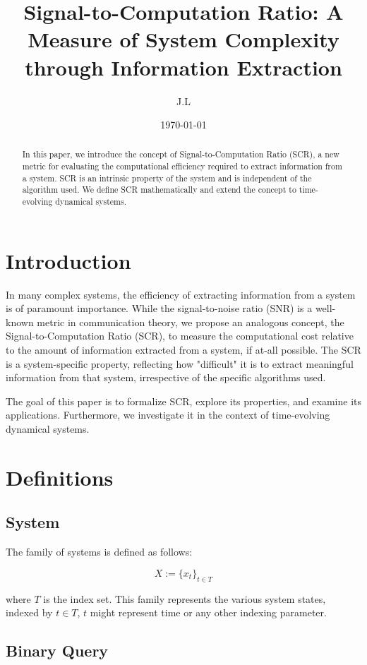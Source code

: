 \documentclass[11pt,a4paper]{article}
\title{Signal-to-Computation Ratio: A Measure of System Complexity through Information Extraction}
\author{J.L}
\date{\today}
\theoremstyle{definition}
\theoremstyle{remark}
\numberwithin{equation}{section}
\begin{document}
\maketitle

\begin{abstract}
In this paper, we introduce the concept of Signal-to-Computation Ratio (SCR), a new metric for evaluating the computational efficiency required to extract information from a system. SCR is an intrinsic property of the system and is independent of the algorithm used. We define SCR mathematically and extend the concept to time-evolving dynamical systems.
\end{abstract}

\section{Introduction}
In many complex systems, the efficiency of extracting information from a system is of paramount importance. 
While the signal-to-noise ratio (SNR) is a well-known metric in communication theory, we propose an analogous concept, the Signal-to-Computation Ratio (SCR), to measure the computational cost relative to the amount of information extracted from a system, if at-all possible. 
The SCR is a system-specific property, reflecting how "difficult" it is to extract meaningful information from that system, irrespective of the specific algorithms used.

The goal of this paper is to formalize SCR, explore its properties, and examine its applications.
Furthermore, we investigate it  in the context of time-evolving dynamical systems. 

\section{Definitions}

\subsection{System}

The family of systems is defined as follows:

\[
X := \{ x_t \}_{t \in T}
\]

where $T$ is the index set.
This family represents the various system states, indexed by $t\in T$, 
$t$ might represent time or any other indexing parameter.

\subsection{Binary Query}
\end{document}

